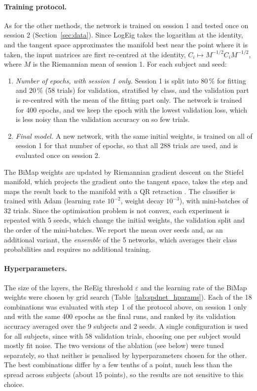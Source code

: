\paragraph{Training protocol.}
As for the other methods, the network is trained on session 1 and tested once on session 2 (Section~\ref{sec:data}). Since LogEig takes the logarithm at the identity, and the tangent space approximates the manifold best near the point where it is taken, the input matrices are first re-centred at the identity, $C_i \mapsto M^{-1/2} C_i M^{-1/2}$, where $M$ is the Riemannian mean of session 1. For each subject and seed:
\begin{enumerate}
  \item \emph{Number of epochs, with session 1 only.} Session 1 is split into 80\,\% for fitting and 20\,\% (58 trials) for validation, stratified by class, and the validation part is re-centred with the mean of the fitting part only. The network is trained for 400 epochs, and we keep the epoch with the lowest validation loss, which is less noisy than the validation accuracy on so few trials.
  \item \emph{Final model.} A new network, with the same initial weights, is trained on all of session 1 for that number of epochs, so that all 288 trials are used, and is evaluated once on session 2.
\end{enumerate}
The BiMap weights are updated by Riemannian gradient descent on the Stiefel manifold, which projects the gradient onto the tangent space, takes the step and maps the result back to the manifold with a QR retraction \citep{absil2008}. The classifier is trained with Adam \citep{kingma2015} (learning rate $10^{-2}$, weight decay $10^{-3}$), with mini-batches of 32 trials. Since the optimisation problem is not convex, each experiment is repeated with 5 seeds, which change the initial weights, the validation split and the order of the mini-batches. We report the mean over seeds and, as an additional variant, the \emph{ensemble} of the 5 networks, which averages their class probabilities and requires no additional training.

\paragraph{Hyperparameters.}
The size of the layers, the ReEig threshold $\varepsilon$ and the learning rate of the BiMap weights were chosen by grid search (Table~\ref{tab:spdnet_hparams}). Each of the 18 combinations was evaluated with step~1 of the protocol above, on session 1 only and with the same 400 epochs as the final runs, and ranked by its validation accuracy averaged over the 9 subjects and 2 seeds. A single configuration is used for all subjects, since with 58 validation trials, choosing one per subject would mostly fit noise. The two versions of the ablation (see below) were tuned separately, so that neither is penalised by hyperparameters chosen for the other. The best combinations differ by a few tenths of a point, much less than the spread across subjects (about 15 points), so the results are not sensitive to this choice.

